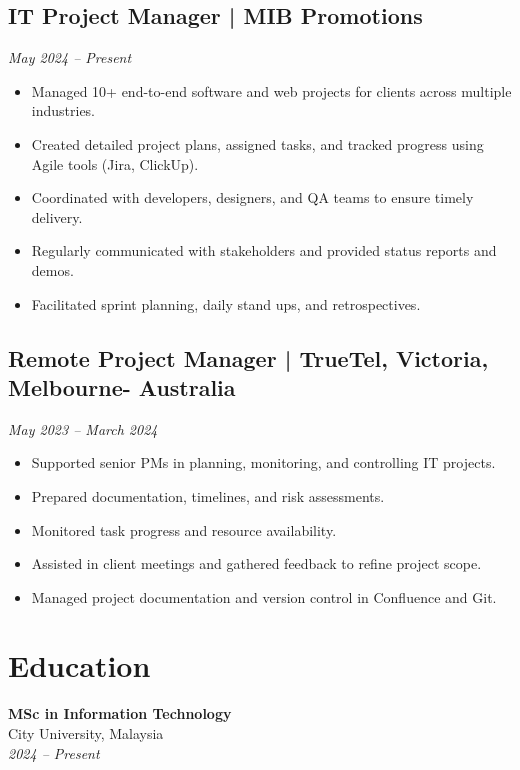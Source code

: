 \documentclass[a4paper,10pt]{article}
\begin{document}
\subsection*{IT Project Manager | MIB Promotions}
\textit{May 2024 – Present} \\

\begin{itemize}
    \item Managed 10+ end-to-end software and web projects for clients across multiple industries.
    \item Created detailed project plans, assigned tasks, and tracked progress using Agile tools (Jira, ClickUp).
    \item Coordinated with developers, designers, and QA teams to ensure timely delivery.
    \item Regularly communicated with stakeholders and provided status reports and demos.
    \item Facilitated sprint planning, daily stand ups, and retrospectives.
\end{itemize}

\subsection*{\textbf{Remote Project Manager} | TrueTel, Victoria, Melbourne- Australia}
\textit{May 2023 – March 2024} \\
\begin{itemize}
    \item Supported senior PMs in planning, monitoring, and controlling IT projects.
    \item Prepared documentation, timelines, and risk assessments.
    \item Monitored task progress and resource availability.
    \item Assisted in client meetings and gathered feedback to refine project scope.
    \item Managed project documentation and version control in Confluence and Git. \\
\end{itemize}

\section*{Education}
\textbf{MSc in Information Technology} \\
City University, Malaysia \\
\textit{2024 – Present}
\end{document}
